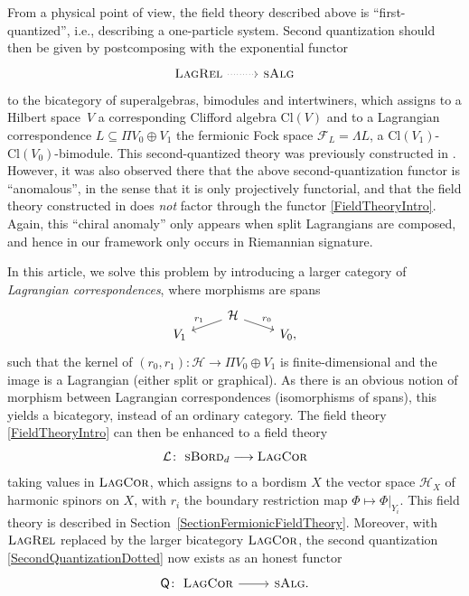 \documentclass[pdftex]{sigma}
\numberwithin{equation}{section}
\newcommand{\LagRel}{\textsc{LagRel}}
\newcommand{\LagCor}{\textsc{LagCor}}
\newcommand{\Cl}{\mathrm{Cl}}
\newcommand{\sBord}{\textsc{sBord}}
\begin{document}
From a physical point of view, the field theory described above is ``first-quantized'', i.e., describing a one-particle system.
Second quantization should then be given by postcomposing with the exponential functor
\begin{equation}
\label{SecondQuantizationDotted}
\begin{tikzcd}
 \LagRel \ar[r, dotted] & \textsc{sAlg}
\end{tikzcd}
\end{equation}
to the bicategory of superalgebras, bimodules and intertwiners,
which assigns to a Hilbert space~$V$ a corresponding Clifford algebra $\Cl(V)$ and to a Lagrangian correspondence ${L\! \subseteq\! \Pi V_0 \!\oplus\! V_1}$ the fermionic Fock space $\mathcal{F}_L = \Lambda L$, a $\Cl(V_1)$-$\Cl(V_0)$-bimodule.
This second-quantized theory was previously constructed in \cite{LudewigRoos}.
However, it was also observed there that the above second-quantization functor is ``anomalous'', in the sense that it is only projectively functorial, and that the field theory constructed in \cite{LudewigRoos} does \emph{not} factor through the functor \eqref{FieldTheoryIntro}.
Again, this ``chiral anomaly'' only appears when split Lagrangians are composed, and hence in our framework only occurs in Riemannian signature.

In this article, we solve this problem by introducing a larger category of \emph{Lagrangian correspondences}, where morphisms are spans
\begin{equation*}
\begin{tikzcd}[row sep = 0.2mm]
 & \mathcal{H} \ar[dl, "r_1"'] \ar[dr, "r_0"] &\\
 V_1 & & V_0,
\end{tikzcd}
\end{equation*}
such that the kernel of $(r_0, r_1)\colon \mathcal{H} \to \Pi V_0 \oplus V_1$ is finite-dimensional and the image is a Lagrangian (either split or graphical).
As there is an obvious notion of morphism between Lagrangian correspondences (isomorphisms of spans), this yields a bicategory, instead of an ordinary category.
The field theory \eqref{FieldTheoryIntro} can then be enhanced to a field theory
\begin{equation}
\label{FTEnhancementIntro}
 \mathcal{L} \colon\ \sBord_d \longrightarrow \LagCor
\end{equation}
taking values in $\LagCor$, which assigns to a bordism $X$ the vector space $\mathcal{H}_X$ of harmonic spinors on $X$, with $r_i$ the boundary restriction map $\Phi \mapsto \Phi|_{Y_i}$.
This field theory is described in Section~\ref{SectionFermionicFieldTheory}.
Moreover, with $\LagRel$ replaced by the larger bicategory $\LagCor$, the second quantization \eqref{SecondQuantizationDotted} now exists as an honest functor
\begin{equation*}
\begin{tikzcd}
 \textsf{Q}\colon\ \LagCor \ar[r] & \textsc{sAlg}.
\end{tikzcd}
\end{equation*}
\end{document}
